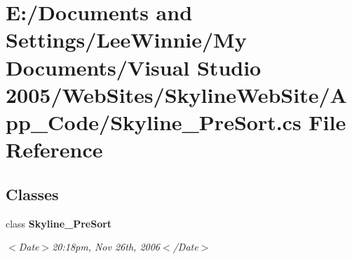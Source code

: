 \section{E:/Documents and Settings/Lee\-Winnie/My Documents/Visual Studio 2005/Web\-Sites/Skyline\-Web\-Site/App\_\-Code/Skyline\_\-Pre\-Sort.cs File Reference}
\label{_skyline___pre_sort_8cs}
\subsection*{Classes}
\begin{CompactItemize}
\item 
class {\bf Skyline\_\-Pre\-Sort}
\begin{CompactList}\small\item\em $<$Date$>$20:18pm, Nov 26th, 2006$<$/Date$>$ \item\end{CompactList}\end{CompactItemize}
